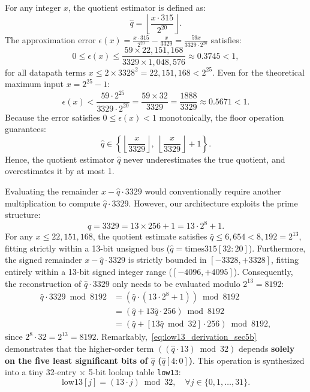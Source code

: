 For any integer $x$, the quotient estimator is defined as:
\begin{equation}
\label{eq:qhat_def_sec5b}
\hat{q} = \left\lfloor \frac{x \cdot 315}{2^{20}} \right\rfloor.
\end{equation}
The approximation error $\epsilon(x) = \frac{x \cdot 315}{2^{20}} - \frac{x}{3329} = \frac{59 x}{3329 \cdot 2^{20}}$ satisfies:
\begin{equation}
0 \le \epsilon(x) \le \frac{59 \times 22,151,168}{3329 \times 1,048,576} \approx 0.3745 < 1,
\end{equation}
for all datapath terms $x \le 2 \times 3328^2 = 22,151,168 < 2^{25}$. Even for the theoretical maximum input $x = 2^{25} - 1$:
\begin{equation}
\epsilon(x) < \frac{59 \cdot 2^{25}}{3329 \cdot 2^{20}} = \frac{59 \times 32}{3329} = \frac{1888}{3329} \approx 0.5671 < 1.
\end{equation}
Because the error satisfies $0 \le \epsilon(x) < 1$ monotonically, the floor operation guarantees:
\begin{equation}
\hat{q} \in \left\{ \left\lfloor \frac{x}{3329} \right\rfloor, \; \left\lfloor \frac{x}{3329} \right\rfloor + 1 \right\}.
\end{equation}
Hence, the quotient estimator $\hat{q}$ never underestimates the true quotient, and overestimates it by at most 1.

Evaluating the remainder $x - \hat{q} \cdot 3329$ would conventionally require another multiplication to compute $\hat{q} \cdot 3329$. However, our architecture exploits the prime structure:
\begin{equation}
q = 3329 = 13 \times 256 + 1 = 13 \cdot 2^8 + 1.
\end{equation}
For any $x \le 22,151,168$, the quotient estimate satisfies $\hat{q} \le 6,654 < 8,192 = 2^{13}$, fitting strictly within a 13-bit unsigned bus ($\hat{q} = \text{times315}[32:20]$). Furthermore, the signed remainder $x - \hat{q} \cdot 3329$ is strictly bounded in $[-3328, +3328]$, fitting entirely within a 13-bit signed integer range ($[-4096, +4095]$). Consequently, the reconstruction of $\hat{q} \cdot 3329$ only needs to be evaluated modulo $2^{13} = 8192$:
\begin{align}
\hat{q} \cdot 3329 \bmod 8192 &= \left( \hat{q} \cdot (13 \cdot 2^8 + 1) \right) \bmod 8192 \nonumber \\
&= \left( \hat{q} + 13\hat{q} \cdot 256 \right) \bmod 8192 \nonumber \\
&= \left( \hat{q} + [13\hat{q} \bmod 32] \cdot 256 \right) \bmod 8192,
\label{eq:low13_derivation_sec5b}
\end{align}
since $2^8 \cdot 32 = 2^{13} = 8192$. Remarkably,~\eqref{eq:low13_derivation_sec5b} demonstrates that the higher-order term $((\hat{q} \cdot 13) \bmod 32)$ depends \textbf{solely on the five least significant bits of $\hat{q}$ ($\hat{q}[4:0]$)}. This operation is synthesized into a tiny 32-entry $\times$ 5-bit lookup table \texttt{low13}:
\begin{equation}
\text{low13}[j] = (13 \cdot j) \bmod 32, \quad \forall j \in \{0, 1, \dots, 31\}.
\end{equation}

